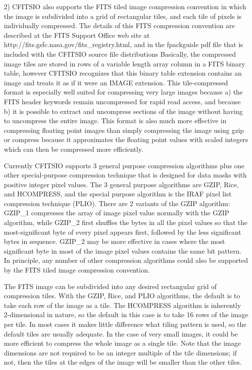 \documentclass[11pt]{book}
\begin{document}
2) CFITSIO also supports the FITS tiled image compression convention in
which the image is subdivided into a grid of rectangular tiles, and each
tile of pixels is individually compressed.   The details of this FITS
compression  convention are described at the FITS Support Office web site at
http://fits.gsfc.nasa.gov/fits\_registry.html, and in the fpackguide pdf file
that is included with the CFITSIO source file distributions Basically, the compressed
image tiles are stored in rows of a variable length array column in a FITS
binary table, however CFITSIO recognizes that this binary table extension
contains an image and treats it as if it were an IMAGE extension.  This
tile-compressed format is especially well suited for compressing very large
images because a) the FITS header keywords remain uncompressed for rapid
read access, and because b) it is possible to extract and uncompress
sections of the image without having to uncompress the entire image. This
format is also much more effective in compressing floating point images
than simply compressing the image using gzip or compress because it
approximates the floating point values with scaled integers which can then
be compressed more efficiently.

Currently CFITSIO supports 3 general purpose compression algorithms  plus
one other special-purpose compression technique that is designed for data
masks with positive integer pixel values. The 3 general purpose algorithms
are GZIP, Rice, and HCOMPRESS, and the special purpose  algorithm is the
IRAF pixel list compression technique (PLIO).  There are 2 variants of the GZIP
algorithm: GZIP\_1 compresses the array of image pixel value normally with the
GZIP algorithm, while GZIP\_2 first shuffles the bytes in all the pixel
values so that the most-significant byte of every pixel appears first, followed
by the less significant bytes in sequence.  GZIP\_2 may be more effective
in cases where the most significant byte in most of the image pixel values
contains the same bit pattern. In principle, any number of
other compression algorithms could also be supported  by the FITS tiled
image compression convention.

The FITS image can be subdivided into any desired rectangular grid of
compression tiles.  With the GZIP, Rice,  and PLIO algorithms, the default
is to take each row of the image as a tile.  The HCOMPRESS algorithm is
inherently 2-dimensional in nature, so the default in this case is to take
16 rows of the image per tile. In most cases it makes little difference what
tiling pattern is used, so the default tiles are usually adequate.  In the
case of very small images, it could be more efficient to compress the whole
image as a single tile. Note that the image dimensions are not required to
be an integer multiple of the tile dimensions; if not, then the tiles at the
edges of the image will be smaller than the other tiles.
\end{document}
